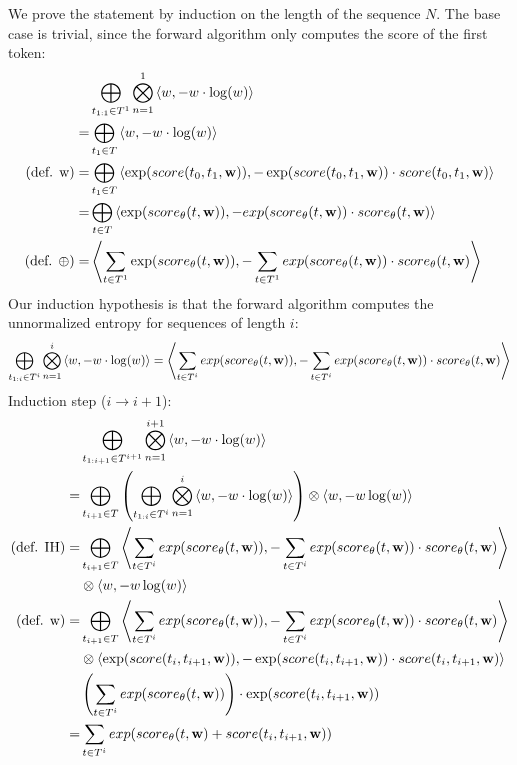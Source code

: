 \documentclass[a4paper,12pt]{ETHexercise}
\begin{document}
We prove the statement by induction on the length of the sequence $N$. The base case is trivial, since the forward algorithm only computes the score of the first token:
\begin{align}
    &\bigoplus_{t_{1:1} \in T^1} \bigotimes_{n=1}^1 \left\langle w, -w \cdot \log(w)\right\rangle\\
    =  &\bigoplus_{t_1 \in T} \left\langle w, -w \cdot \log(w)\right\rangle\\
   (\text{def. w}) = &\bigoplus_{t_1 \in T} \left\langle\exp(score(t_0, t_1, \textbf{w})), -\exp(score(t_0, t_1, \textbf{w})) \cdot score(t_0, t_1, \textbf{w})\right\rangle\\
    = &\bigoplus_{t \in T} \left\langle\exp(score_\theta(t, \textbf{w})), -exp(score_\theta(t, \textbf{w})) \cdot score_\theta(t, \textbf{w})\right\rangle\\
    (\text{def. }\oplus) = &\left\langle\sum_{t \in T^1} \exp(score_\theta(t, \textbf{w})), - \sum_{t \in T^1} exp(score_\theta(t, \textbf{w})) \cdot score_\theta(t, \textbf{w})\right\rangle
\end{align}
Our induction hypothesis is that the forward algorithm computes the unnormalized entropy for sequences of length $i$:
\begin{align*}
    \bigoplus_{t_{1:i} \in T^i} \bigotimes_{n=1}^i \left\langle w, -w \cdot \log(w)\right\rangle = \left\langle\sum_{t \in T^i} exp(score_\theta(t,\textbf{w})), -\sum_{t \in T^i} exp(score_\theta(t,\textbf{w})) \cdot score_\theta(t,\textbf{w})\right\rangle
\end{align*}
Induction step ($i \rightarrow i+1$):
\begin{align} 
    &\bigoplus_{t_{1:i+1} \in T^{i+1}} \bigotimes_{n=1}^{i+1} \left\langle w, -w \cdot \log(w)\right\rangle\\
    = &\bigoplus_{t_{i+1} \in T} \left( \bigoplus_{t_{1:i} \in T^{i}} \bigotimes_{n=1}^{i} \left\langle w, -w \cdot \log(w)\right\rangle \right) \otimes \left\langle w, -w\log(w)\right\rangle \\
   \text{(def. IH)} = &\bigoplus_{t_{i+1} \in T} \left\langle\sum_{t \in T^i} exp(score_\theta(t,\textbf{w})), -\sum_{t \in T^i} exp(score_\theta(t,\textbf{w})) \cdot score_\theta(t,\textbf{w})\right\rangle \\ 
   &\otimes \left\langle w, -w\log(w)\right\rangle \\
   \text{(def. w)} = &\bigoplus_{t_{i+1} \in T} \left\langle\sum_{t \in T^i} exp(score_\theta(t,\textbf{w})), -\sum_{t \in T^i} exp(score_\theta(t,\textbf{w})) \cdot score_\theta(t,\textbf{w})\right\rangle \\ 
   &\otimes \left\langle\exp(score(t_i, t_{i+1}, \textbf{w})), -\exp(score(t_i, t_{i+1}, \textbf{w}))\cdot score(t_i, t_{i+1}, \textbf{w})\right\rangle
   \label{eq:base}\\
   &\left( \sum_{t \in T^i} exp(score_\theta(t,\textbf{w})) \right) \cdot \exp(score(t_i, t_{i+1}, \textbf{w}))\label{eq:pull_in}\\
   = & \sum_{t \in T^i} exp(score_\theta(t,\textbf{w}) + score(t_i, t_{i+1}, \textbf{w})) 
\end{align}
\end{document}
